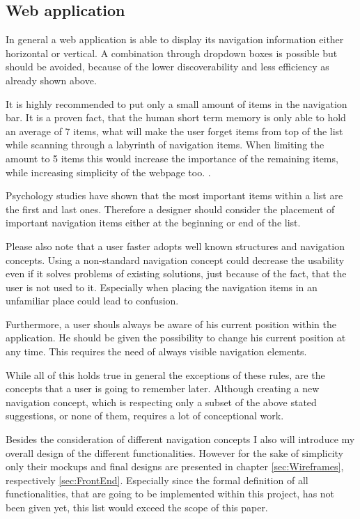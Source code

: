 \subsection{Web application}
\label{sec:UIConceptWeb}

In general a web application is able to display its navigation information either horizontal or vertical. A combination through dropdown boxes is possible but should be avoided, because of the lower discoverability and less efficiency as  already shown above. \cite{Crestodina:2015aa}

It is highly recommended to put only a small amount of items in the navigation bar. It is a proven fact, that the human short term memory is only able to hold an average of 7 items, what will make the user forget items from top of the list while scanning through a labyrinth of navigation items. When limiting the amount to 5 items this would increase the importance of the remaining items, while increasing simplicity of the webpage too. \cite{Crestodina:2015aa}. 

Psychology studies have shown that the most important items within a list are the first and last ones. Therefore a designer should consider the placement of important navigation items either at the beginning or end of the list. \cite{Crestodina:2015aa}

Please also note that a user faster adopts well known structures and navigation concepts. Using a non-standard navigation concept could decrease the usability even if it solves problems of existing solutions, just because of the fact, that the user is not used to it. Especially when placing the navigation items in an unfamiliar place could lead to confusion. \cite{Crestodina:2015aa}

Furthermore, a user shouls always be aware of his current position within the application. He should be given the possibility to change his current position at any time. This requires the need of always visible navigation elements. 

While all of this holds true in general the exceptions of these rules, are the concepts that a user is going to remember later. Although creating a new navigation concept, which is respecting only a subset of the above stated suggestions, or none of them, requires a lot of conceptional work. \cite{Hampton-Smith:2013aa}

Besides the consideration of different navigation concepts I also will introduce my overall design of the different functionalities. However for the sake of simplicity only their mockups and final designs are presented in chapter \vref{sec:Wireframes}, respectively  \vref{sec:FrontEnd}. Especially since the formal definition of all functionalities, that are going to be implemented within this project, has not been given yet, this list would exceed the scope of this paper.

